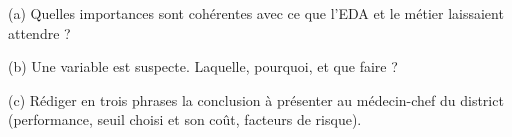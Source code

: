 \documentclass[10pt,a4paper]{article}
\newcommand{\repligne}{\par\vspace{0.42cm}\noindent\dotfill}
\begin{document}
\vspace{0.2cm}
(a) Quelles importances sont cohérentes avec ce que l'EDA et le métier laissaient attendre ?
\repligne

\vspace{0.15cm}
(b) Une variable est suspecte. Laquelle, pourquoi, et que faire ?
\repligne\repligne

\vspace{0.15cm}
(c) Rédiger en trois phrases la conclusion à présenter au médecin-chef du district (performance, seuil choisi et son coût, facteurs de risque).
\repligne\repligne\repligne
\end{document}
